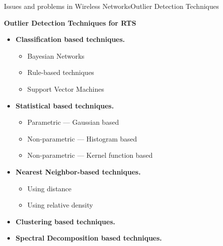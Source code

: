 \begin{frame}{Issues and problems in Wireless Networks}{Outlier Detection Techniques}
\begin{block}{\textbf{Outlier Detection Techniques for RTS}}
	
	\begin{minipage}[t]{0.6\linewidth}
		\begin{itemize}
			\footnotesize
			\item \textbf{Classification based techniques.}
			\begin{itemize}
				\item Bayesian Networks
				\item Rule-based techniques
				\item Support Vector Machines
			\end{itemize}
			
			\item \textbf{Statistical based techniques.}
			\begin{itemize}
				\item Parametric --- Gaussian based
				\item Non-parametric --- Histogram based
				\item Non-parametric --- Kernel function based
			\end{itemize}
		
			\item \textbf{Nearest Neighbor-based techniques.}
			\begin{itemize}
				\item Using distance
				\item Using relative density
			\end{itemize}
			\item \textbf{Clustering based techniques.}
			
			\item \textbf{Spectral Decomposition based techniques.}
			
		\end{itemize}
	\end{minipage}\hfill
	\begin{minipage}[t]{0.38\linewidth}
		

\end{minipage}
\end{block}
\end{frame}
